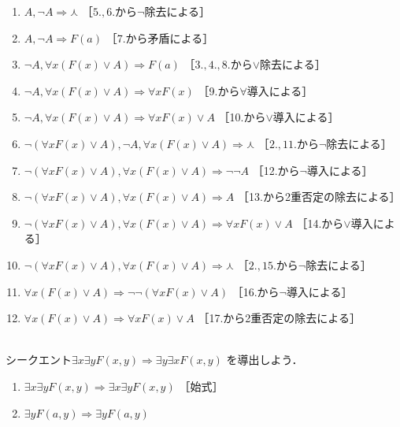 \begin{description}
\begin{enumerate}[1. ]
    \item $ A , \lnot A \Longrightarrow \curlywedge$
      \quad ［$5.,6.$から$\lnot$除去による］
    \item $A , \lnot A \Longrightarrow F(a)$
      \quad ［7.から矛盾による］
    \item $\lnot A , \forall x ( F(x) \lor A)
      \Longrightarrow F(a)$ \quad 
      ［$3.,4.,8.$から$\lor$除去による］
    \item $\lnot A , \forall x (F(x) \lor A)
      \Longrightarrow \forall x F(x)$
      \quad ［9.から$\forall$導入による］
    \item $\lnot A , \forall x (F(x) \lor A) 
      \Longrightarrow \forall x F(x) \lor A$
      \quad ［10.から$\lor$導入による］
    \item $\lnot (\forall x F(x) \lor A) , \lnot A , 
      \forall x (F(x) \lor A) \Longrightarrow \curlywedge$
      \quad ［$2.,11.$から$\lnot$除去による］
    \item $\lnot ( \forall x F(x) \lor A),
      \forall x( F(x) \lor A) \Longrightarrow \lnot \lnot A$
      \quad ［12.から$\lnot$導入による］
    \item $\lnot ( \forall x F(x) \lor A) , 
      \forall x (F(x) \lor A) \Longrightarrow A$
      \quad ［13.から2重否定の除去による］
    \item $\lnot ( \forall x F(x) \lor A ),
      \forall x (F(x) \lor A) \Longrightarrow \forall x F(x) \lor A$
      \quad ［14.から$\lor$導入による］
    \item $\lnot ( \forall x F(x) \lor A ) ,
      \forall x (F(x) \lor A) \Longrightarrow \curlywedge$
      \quad ［$2.,15.$から$\lnot$除去による］
    \item $\forall x (F(x) \lor A ) \Longrightarrow 
      \lnot \lnot ( \forall x F(x) \lor A)$
      \quad ［16.から$\lnot$導入による］
    \item $\forall x (F(x) \lor A) \Longrightarrow 
      \forall x F(x) \lor A$
      \quad ［17.から2重否定の除去による］
  \end{enumerate}
\item[\refque{que:genteikoukan}] \mbox{} \\
  シークエント$\exists x \exists y F(x,y) \Longrightarrow \exists y \exists x F(x,y)$
  を導出しよう．
  \begin{enumerate}[1. ]
    \item $\exists x \exists y F(x,y) \Longrightarrow \exists x \exists y F(x,y)$
           \quad ［始式］
    \item $\exists y F(a, y) \Longrightarrow \exists y F(a,y)$

\end{enumerate}
\end{description}
